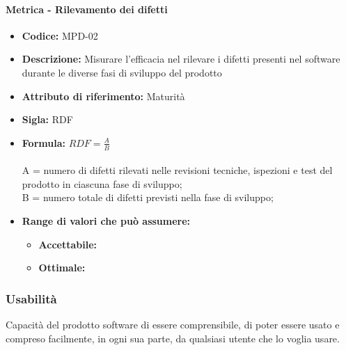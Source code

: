                 \paragraph{Metrica - Rilevamento dei difetti} 
                  \begin{itemize}
         \item   \textbf{Codice:} MPD-02
         \item   \textbf{Descrizione:} Misurare l'efficacia nel rilevare i difetti presenti nel software durante le diverse fasi di sviluppo del prodotto
        \item    \textbf{Attributo di riferimento:} Maturità
        \item    \textbf{Sigla:} RDF
        \item    \textbf{Formula:} \begin{math} RDF = \frac{A}{B}\end{math}\\ \\
             A = numero di difetti rilevati nelle revisioni tecniche, ispezioni e test del prodotto in ciascuna fase di sviluppo;\\
              B = numero totale di difetti previsti nella fase di sviluppo;
             \item \textbf{Range di valori che può assumere:}
        \begin{itemize}
            \item \textbf{Accettabile:} 
            \item \textbf{Ottimale:} 
        \end{itemize}
       \end{itemize}
              
                  
              
           
\subsubsection{Usabilità} 
Capacità del prodotto software di essere comprensibile, di poter essere usato e compreso facilmente, in ogni sua parte, da qualsiasi utente che lo voglia usare. \\

